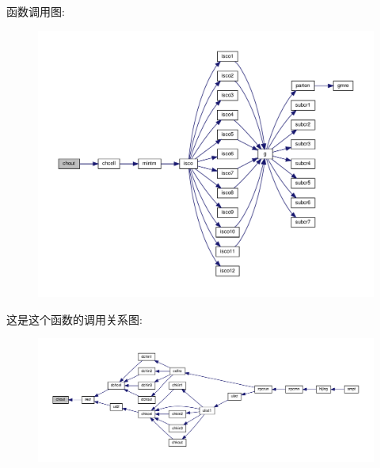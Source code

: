 函数调用图\+:
\nopagebreak
\begin{figure}[H]
\begin{center}
\leavevmode
\includegraphics[width=350pt]{chout_8f90_a3a85681027db781e21cd478154fb62ff_cgraph}
\end{center}
\end{figure}
这是这个函数的调用关系图\+:
\nopagebreak
\begin{figure}[H]
\begin{center}
\leavevmode
\includegraphics[width=350pt]{chout_8f90_a3a85681027db781e21cd478154fb62ff_icgraph}
\end{center}
\end{figure}

